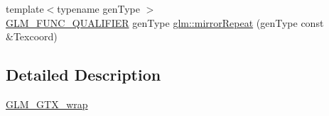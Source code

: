 \begin{DoxyCompactItemize}
\item 
{\footnotesize template$<$typename gen\+Type $>$ }\\\mbox{\hyperlink{setup_8hpp_a33fdea6f91c5f834105f7415e2a64407}{G\+L\+M\+\_\+\+F\+U\+N\+C\+\_\+\+Q\+U\+A\+L\+I\+F\+I\+ER}} gen\+Type \mbox{\hyperlink{group__gtx__wrap_ga16a89b0661b60d5bea85137bbae74d73}{glm\+::mirror\+Repeat}} (gen\+Type const \&Texcoord)
\end{DoxyCompactItemize}


\subsection{Detailed Description}
\mbox{\hyperlink{group__gtx__wrap}{G\+L\+M\+\_\+\+G\+T\+X\+\_\+wrap}} 